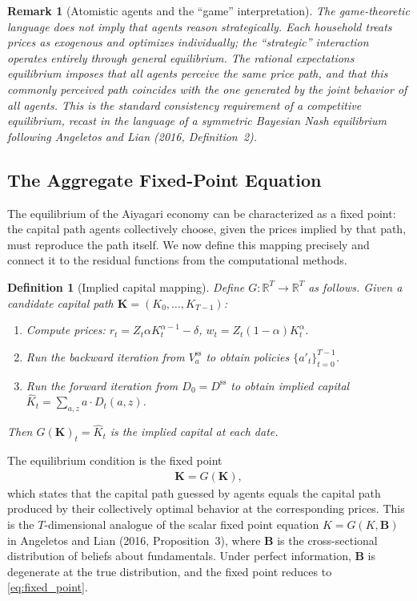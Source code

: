 \documentclass[12pt]{article}
\newtheorem{definition}{Definition}
\newtheorem{remark}{Remark}
\newcommand{\R}{\mathbb{R}}
\begin{document}
\begin{remark}[Atomistic agents and the ``game'' interpretation]
\label{rem:atomistic}
The game-theoretic language does not imply that agents reason strategically. Each household treats prices as exogenous and optimizes individually; the ``strategic'' interaction operates entirely through general equilibrium. The rational expectations equilibrium imposes that all agents perceive the same price path, and that this commonly perceived path coincides with the one generated by the joint behavior of all agents. This is the standard consistency requirement of a competitive equilibrium, recast in the language of a symmetric Bayesian Nash equilibrium following Angeletos and Lian (2016, Definition~2).
\end{remark}

\subsection{The Aggregate Fixed-Point Equation}
\label{ssec:fixed_point}

The equilibrium of the Aiyagari economy can be characterized as a fixed point: the capital path agents collectively choose, given the prices implied by that path, must reproduce the path itself. We now define this mapping precisely and connect it to the residual functions from the computational methods.

\begin{definition}[Implied capital mapping]
\label{def:G_mapping}
Define $G: \R^T \to \R^T$ as follows. Given a candidate capital path $\mathbf{K} = (K_0, \ldots, K_{T-1})$:
\begin{enumerate}[nosep]
    \item Compute prices: $r_t = Z_t \alpha K_t^{\alpha-1} - \delta$, $w_t = Z_t(1-\alpha)K_t^\alpha$.
    \item Run the backward iteration from $V_a^{\text{ss}}$ to obtain policies $\{a'_t\}_{t=0}^{T-1}$.
    \item Run the forward iteration from $D_0 = D^{\text{ss}}$ to obtain implied capital $\hat{K}_t = \sum_{a,z} a \cdot D_t(a,z)$.
\end{enumerate}
Then $G(\mathbf{K})_t = \hat{K}_t$ is the implied capital at each date.
\end{definition}

\noindent The equilibrium condition is the fixed point
\begin{align}
    \mathbf{K} = G(\mathbf{K}), \label{eq:fixed_point}
\end{align}
which states that the capital path guessed by agents equals the capital path produced by their collectively optimal behavior at the corresponding prices. This is the $T$-dimensional analogue of the scalar fixed point equation $K = G(K, \mathbf{B})$ in Angeletos and Lian (2016, Proposition~3), where $\mathbf{B}$ is the cross-sectional distribution of beliefs about fundamentals. Under perfect information, $\mathbf{B}$ is degenerate at the true distribution, and the fixed point reduces to \eqref{eq:fixed_point}.
\end{document}
